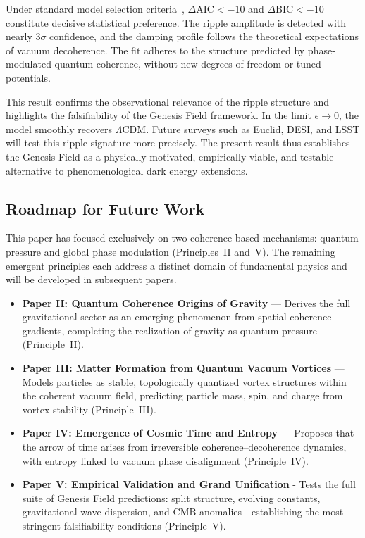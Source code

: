 Under standard model selection criteria~\cite{KassRaftery1995}, $\Delta \text{AIC} < -10$ and $\Delta \text{BIC} < -10$ constitute decisive statistical preference. The ripple amplitude is detected with nearly $3\sigma$ confidence, and the damping profile follows the theoretical expectations of vacuum decoherence. The fit adheres to the structure predicted by phase-modulated quantum coherence, without new degrees of freedom or tuned potentials.

This result confirms the observational relevance of the ripple structure and highlights the falsifiability of the Genesis Field framework. In the limit $\epsilon \to 0$, the model smoothly recovers $\Lambda$CDM. Future surveys such as Euclid, DESI, and LSST will test this ripple signature more precisely. The present result thus establishes the Genesis Field as a physically motivated, empirically viable, and testable alternative to phenomenological dark energy extensions.

\subsection{Roadmap for Future Work}
\label{sec:roadmap_future}

This paper has focused exclusively on two coherence-based mechanisms: quantum pressure and global phase modulation (Principles~II and~V). The remaining emergent principles each address a distinct domain of fundamental physics and will be developed in subsequent papers.

\begin{itemize}
  
    \item \textbf{Paper II: Quantum Coherence Origins of Gravity} — Derives the full gravitational sector as an emerging phenomenon from spatial coherence gradients, completing the realization of gravity as quantum pressure (Principle~II).
 
    \item \textbf{Paper III: Matter Formation from Quantum Vacuum Vortices} — Models particles as stable, topologically quantized vortex structures within the coherent vacuum field, predicting particle mass, spin, and charge from vortex stability (Principle~III).

    \item \textbf{Paper IV: Emergence of Cosmic Time and Entropy} — Proposes that the arrow of time arises from irreversible coherence–decoherence dynamics, with entropy linked to vacuum phase disalignment (Principle~IV).    

    \item \textbf{Paper V: Empirical Validation and Grand Unification} - Tests the full suite of Genesis Field predictions: split structure, evolving constants, gravitational wave dispersion, and CMB anomalies - establishing the most stringent falsifiability conditions (Principle~V).
\end{itemize}

